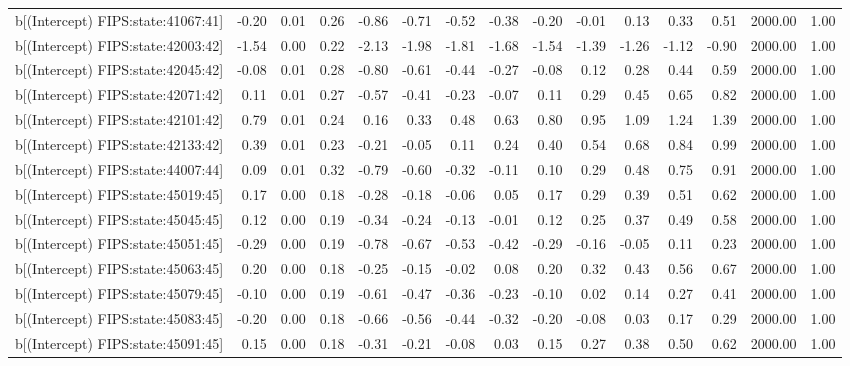\begin{table}[ht]
\begin{tabular}{rrrrrrrrrrrrrrr}
  b[(Intercept) FIPS:state:41067:41] & -0.20 & 0.01 & 0.26 & -0.86 & -0.71 & -0.52 & -0.38 & -0.20 & -0.01 & 0.13 & 0.33 & 0.51 & 2000.00 & 1.00 \\ 
  b[(Intercept) FIPS:state:42003:42] & -1.54 & 0.00 & 0.22 & -2.13 & -1.98 & -1.81 & -1.68 & -1.54 & -1.39 & -1.26 & -1.12 & -0.90 & 2000.00 & 1.00 \\ 
  b[(Intercept) FIPS:state:42045:42] & -0.08 & 0.01 & 0.28 & -0.80 & -0.61 & -0.44 & -0.27 & -0.08 & 0.12 & 0.28 & 0.44 & 0.59 & 2000.00 & 1.00 \\ 
  b[(Intercept) FIPS:state:42071:42] & 0.11 & 0.01 & 0.27 & -0.57 & -0.41 & -0.23 & -0.07 & 0.11 & 0.29 & 0.45 & 0.65 & 0.82 & 2000.00 & 1.00 \\ 
  b[(Intercept) FIPS:state:42101:42] & 0.79 & 0.01 & 0.24 & 0.16 & 0.33 & 0.48 & 0.63 & 0.80 & 0.95 & 1.09 & 1.24 & 1.39 & 2000.00 & 1.00 \\ 
  b[(Intercept) FIPS:state:42133:42] & 0.39 & 0.01 & 0.23 & -0.21 & -0.05 & 0.11 & 0.24 & 0.40 & 0.54 & 0.68 & 0.84 & 0.99 & 2000.00 & 1.00 \\ 
  b[(Intercept) FIPS:state:44007:44] & 0.09 & 0.01 & 0.32 & -0.79 & -0.60 & -0.32 & -0.11 & 0.10 & 0.29 & 0.48 & 0.75 & 0.91 & 2000.00 & 1.00 \\ 
  b[(Intercept) FIPS:state:45019:45] & 0.17 & 0.00 & 0.18 & -0.28 & -0.18 & -0.06 & 0.05 & 0.17 & 0.29 & 0.39 & 0.51 & 0.62 & 2000.00 & 1.00 \\ 
  b[(Intercept) FIPS:state:45045:45] & 0.12 & 0.00 & 0.19 & -0.34 & -0.24 & -0.13 & -0.01 & 0.12 & 0.25 & 0.37 & 0.49 & 0.58 & 2000.00 & 1.00 \\ 
  b[(Intercept) FIPS:state:45051:45] & -0.29 & 0.00 & 0.19 & -0.78 & -0.67 & -0.53 & -0.42 & -0.29 & -0.16 & -0.05 & 0.11 & 0.23 & 2000.00 & 1.00 \\ 
  b[(Intercept) FIPS:state:45063:45] & 0.20 & 0.00 & 0.18 & -0.25 & -0.15 & -0.02 & 0.08 & 0.20 & 0.32 & 0.43 & 0.56 & 0.67 & 2000.00 & 1.00 \\ 
  b[(Intercept) FIPS:state:45079:45] & -0.10 & 0.00 & 0.19 & -0.61 & -0.47 & -0.36 & -0.23 & -0.10 & 0.02 & 0.14 & 0.27 & 0.41 & 2000.00 & 1.00 \\ 
  b[(Intercept) FIPS:state:45083:45] & -0.20 & 0.00 & 0.18 & -0.66 & -0.56 & -0.44 & -0.32 & -0.20 & -0.08 & 0.03 & 0.17 & 0.29 & 2000.00 & 1.00 \\ 
  b[(Intercept) FIPS:state:45091:45] & 0.15 & 0.00 & 0.18 & -0.31 & -0.21 & -0.08 & 0.03 & 0.15 & 0.27 & 0.38 & 0.50 & 0.62 & 2000.00 & 1.00 \\ 

\end{tabular}
\end{table}
